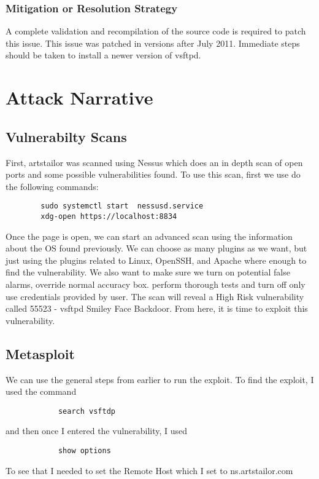 \documentclass[notitlepage]{article}
\begin{document}
    \subsubsection*{Mitigation or Resolution Strategy}
        A complete validation and recompilation of the source code is required to patch this issue. This
        issue was patched in versions after July 2011. Immediate steps should be taken to install a newer version
        of vsftpd.

\section{Attack Narrative}

    \subsection{Vulnerabilty Scans}
        First, artstailor was scanned using Nessus which does an in depth scan of open ports and 
        some possible vulnerabilities found. To use this scan, first we use do the following commands:
        \begin{verbatim}
        sudo systemctl start  nessusd.service
        xdg-open https://localhost:8834
        \end{verbatim}
        Once the page is open, we can start an advanced scan using the information about the OS found
        previously. We can choose as many plugins as we want, but just using the plugins related to Linux, OpenSSH,
        and Apache where enough to find the vulnerability. We also want to make sure we turn on potential false alarms,
        override normal accuracy box. perform thorough tests and turn off only use credentials provided by user. The scan
        will reveal a High Risk vulnerability called 55523 - vsftpd Smiley Face Backdoor. From here, it is time
        to exploit this vulnerability.

    \subsection{Metasploit}
        We can use the general steps from earlier to run the exploit. To find the exploit, I used
        the command
        \begin{verbatim}
            search vsftdp
        \end{verbatim}
        and then once I entered the vulnerability, I used 
        \begin{verbatim}
            show options
        \end{verbatim}
        To see that I needed to set the Remote Host which I set to ns.artstailor.com
\end{document}
